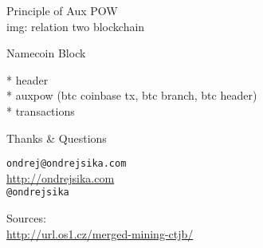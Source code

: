 \documentclass{beamer}
\begin{document}
\begin{frame}

    {\Huge Principle of Aux POW}\\


    img: relation two blockchain

\end{frame}

\begin{frame}

    {\Huge Namecoin Block}\\

    \vspace{5mm}

    * header\\
    * auxpow (btc coinbase tx, btc branch, btc header)\\
    * transactions\\



\end{frame}


\begin{frame}

    {\Huge Thanks \& Questions}\\

    \vspace{1cm}

    \texttt{ondrej@ondrejsika.com}\\
    \url{http://ondrejsika.com}\\
    \texttt{@ondrejsika}\\

    \vspace{1cm}

    Sources:\\
    \url{http://url.os1.cz/merged-mining-ctjb/}
\end{frame}
\end{document}
